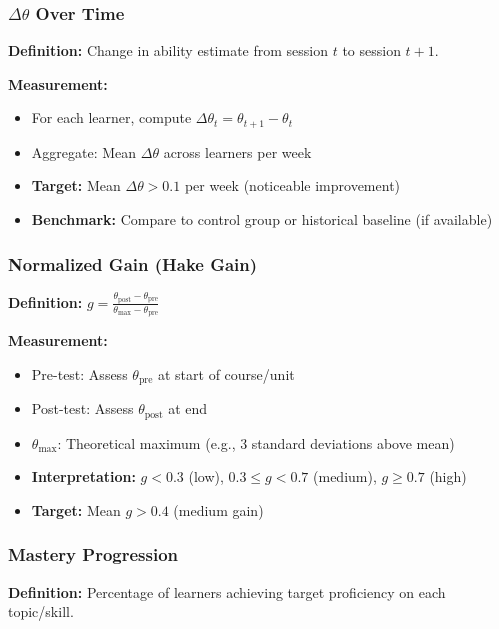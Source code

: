 \documentclass[11pt,letterpaper]{article}
\begin{document}
\subsubsection{$\Delta\theta$ Over Time}\label{subsubsec:delta-theta-over-time}

\textbf{Definition:} Change in ability estimate from session $t$ to session $t+1$.

\textbf{Measurement:}
\begin{itemize}
\item For each learner, compute $\Delta\theta_t = \theta_{t+1} - \theta_t$
\item Aggregate: Mean $\Delta\theta$ across learners per week
\item \textbf{Target:} Mean $\Delta\theta > 0.1$ per week (noticeable improvement)
\item \textbf{Benchmark:} Compare to control group or historical baseline (if available)
\end{itemize}

\subsubsection{Normalized Gain (Hake Gain)}\label{subsubsec:normalized-gain}

\textbf{Definition:} $g = \frac{\theta_{\text{post}} - \theta_{\text{pre}}}{\theta_{\text{max}} - \theta_{\text{pre}}}$

\textbf{Measurement:}
\begin{itemize}
\item Pre-test: Assess $\theta_{\text{pre}}$ at start of course/unit
\item Post-test: Assess $\theta_{\text{post}}$ at end
\item $\theta_{\text{max}}$: Theoretical maximum (e.g., 3 standard deviations above mean)
\item \textbf{Interpretation:} $g < 0.3$ (low), $0.3 \leq g < 0.7$ (medium), $g \geq 0.7$ (high)
\item \textbf{Target:} Mean $g > 0.4$ (medium gain)
\end{itemize}

\subsubsection{Mastery Progression}\label{subsubsec:mastery-progression}

\textbf{Definition:} Percentage of learners achieving target proficiency on each topic/skill.
\end{document}
